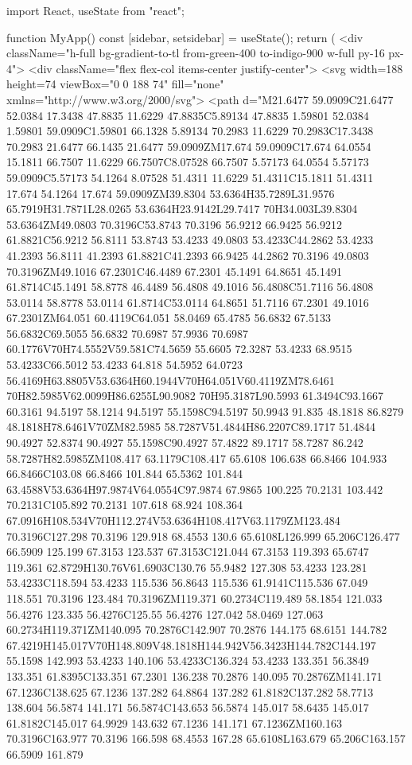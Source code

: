 import React, { useState } from "react";

function MyApp() {
    const [sidebar, setsidebar] = useState();
    return (
        <div className="h-full bg-gradient-to-tl from-green-400 to-indigo-900 w-full py-16 px-4">
            <div className="flex flex-col items-center justify-center">
                <svg width={188} height={74} viewBox="0 0 188 74" fill="none" xmlns="http://www.w3.org/2000/svg">
                    <path
                        d="M21.6477 59.0909C21.6477 52.0384 17.3438 47.8835 11.6229 47.8835C5.89134 47.8835 1.59801 52.0384 1.59801 59.0909C1.59801 66.1328 5.89134 70.2983 11.6229 70.2983C17.3438 70.2983 21.6477 66.1435 21.6477 59.0909ZM17.674 59.0909C17.674 64.0554 15.1811 66.7507 11.6229 66.7507C8.07528 66.7507 5.57173 64.0554 5.57173 59.0909C5.57173 54.1264 8.07528 51.4311 11.6229 51.4311C15.1811 51.4311 17.674 54.1264 17.674 59.0909ZM39.8304 53.6364H35.7289L31.9576 65.7919H31.7871L28.0265 53.6364H23.9142L29.7417 70H34.003L39.8304 53.6364ZM49.0803 70.3196C53.8743 70.3196 56.9212 66.9425 56.9212 61.8821C56.9212 56.8111 53.8743 53.4233 49.0803 53.4233C44.2862 53.4233 41.2393 56.8111 41.2393 61.8821C41.2393 66.9425 44.2862 70.3196 49.0803 70.3196ZM49.1016 67.2301C46.4489 67.2301 45.1491 64.8651 45.1491 61.8714C45.1491 58.8778 46.4489 56.4808 49.1016 56.4808C51.7116 56.4808 53.0114 58.8778 53.0114 61.8714C53.0114 64.8651 51.7116 67.2301 49.1016 67.2301ZM64.051 60.4119C64.051 58.0469 65.4785 56.6832 67.5133 56.6832C69.5055 56.6832 70.6987 57.9936 70.6987 60.1776V70H74.5552V59.581C74.5659 55.6605 72.3287 53.4233 68.9515 53.4233C66.5012 53.4233 64.818 54.5952 64.0723 56.4169H63.8805V53.6364H60.1944V70H64.051V60.4119ZM78.6461 70H82.5985V62.0099H86.6255L90.9082 70H95.3187L90.5993 61.3494C93.1667 60.3161 94.5197 58.1214 94.5197 55.1598C94.5197 50.9943 91.835 48.1818 86.8279 48.1818H78.6461V70ZM82.5985 58.7287V51.4844H86.2207C89.1717 51.4844 90.4927 52.8374 90.4927 55.1598C90.4927 57.4822 89.1717 58.7287 86.242 58.7287H82.5985ZM108.417 63.1179C108.417 65.6108 106.638 66.8466 104.933 66.8466C103.08 66.8466 101.844 65.5362 101.844 63.4588V53.6364H97.9874V64.0554C97.9874 67.9865 100.225 70.2131 103.442 70.2131C105.892 70.2131 107.618 68.924 108.364 67.0916H108.534V70H112.274V53.6364H108.417V63.1179ZM123.484 70.3196C127.298 70.3196 129.918 68.4553 130.6 65.6108L126.999 65.206C126.477 66.5909 125.199 67.3153 123.537 67.3153C121.044 67.3153 119.393 65.6747 119.361 62.8729H130.76V61.6903C130.76 55.9482 127.308 53.4233 123.281 53.4233C118.594 53.4233 115.536 56.8643 115.536 61.9141C115.536 67.049 118.551 70.3196 123.484 70.3196ZM119.371 60.2734C119.489 58.1854 121.033 56.4276 123.335 56.4276C125.55 56.4276 127.042 58.0469 127.063 60.2734H119.371ZM140.095 70.2876C142.907 70.2876 144.175 68.6151 144.782 67.4219H145.017V70H148.809V48.1818H144.942V56.3423H144.782C144.197 55.1598 142.993 53.4233 140.106 53.4233C136.324 53.4233 133.351 56.3849 133.351 61.8395C133.351 67.2301 136.238 70.2876 140.095 70.2876ZM141.171 67.1236C138.625 67.1236 137.282 64.8864 137.282 61.8182C137.282 58.7713 138.604 56.5874 141.171 56.5874C143.653 56.5874 145.017 58.6435 145.017 61.8182C145.017 64.9929 143.632 67.1236 141.171 67.1236ZM160.163 70.3196C163.977 70.3196 166.598 68.4553 167.28 65.6108L163.679 65.206C163.157 66.5909 161.879 }
